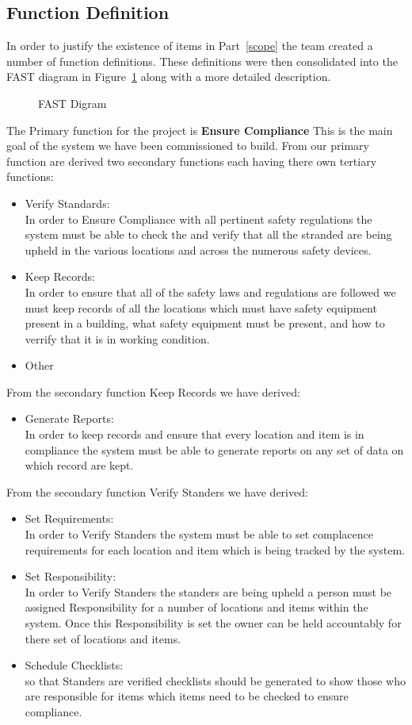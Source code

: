 \documentclass[Letter,11pt]{article}
\begin{document}
	\subsection{Function Definition} 
		In order to justify the existence of items in Part~\ref{scope} the team created a number of function definitions. These definitions were then consolidated into the FAST diagram in Figure~\ref{fast1} along with a more detailed description.
		\begin{figure}[h]
			\centering
			
			\caption{\label{fast1} FAST Digram}
		\end{figure}
		The Primary function for the project is \textbf{Ensure Compliance} This is the main goal of the system we have been commissioned to build. From our primary function are derived two secondary functions each having there own tertiary functions:
		\begin{itemize}
			\item Verify Standards:\\
			In order to Ensure Compliance with all pertinent safety regulations the system must be able to check the and verify that all the stranded are being upheld in the various locations and across the numerous safety devices.
			\item Keep Records:\\
			In order to ensure that all of the safety laws and regulations are followed we must keep records of all the locations which must have safety equipment present in a building, what safety equipment must be present, and how to verrify that it is in working condition.  

			\item Other 
		\end{itemize}
		From the secondary function Keep Records we have derived: 
		\begin{itemize}
			\item Generate Reports:\\
			In order to keep records and ensure that every location and item is in compliance the system must be able to generate reports on any set of data on which record are kept. 
		\end{itemize}
		From the secondary function Verify Standers we have derived:
		\begin{itemize}
			\item Set Requirements:\\
			In order to Verify Standers the system must be able to set complacence requirements for each location and item which is being tracked by the system.
			\item Set Responsibility:\\
			In order to Verify Standers the standers are being upheld a person must be assigned Responsibility for a number of locations and items within the system. Once this Responsibility is set the owner can be held accountably for there set of locations and items. 
			\item Schedule Checklists:\\
			so that Standers are verified  checklists should be generated to show those who are responsible for items which items need to be checked to ensure compliance.
		\end{itemize}
		
\end{document}
